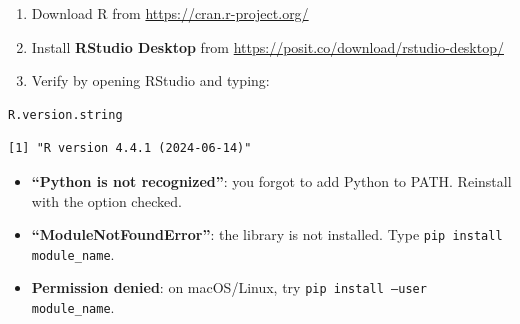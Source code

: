 \begin{enumerate}
\item Download R from \url{https://cran.r-project.org/}
\item Install \textbf{RStudio Desktop} from \url{https://posit.co/download/rstudio-desktop/}
\item Verify by opening RStudio and typing:
\end{enumerate}

\begin{codeblock}[title=\textbf{R Console}]
\begin{verbatim}
R.version.string
\end{verbatim}
\end{codeblock}

\begin{codeoutput}
\begin{verbatim}
[1] "R version 4.4.1 (2024-06-14)"
\end{verbatim}
\end{codeoutput}

\begin{errmark}
\begin{itemize}
\item \textbf{``Python is not recognized''}: you forgot to add Python to PATH. Reinstall with the option checked.
\item \textbf{``ModuleNotFoundError''}: the library is not installed. Type \texttt{pip install module\_name}.
\item \textbf{Permission denied}: on macOS/Linux, try \texttt{pip install --user module\_name}.
\end{itemize}
\end{errmark}
